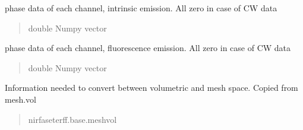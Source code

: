 \documentclass[letterpaper,10pt,english]{sphinxmanual}
\begin{document}
\begin{fulllineitems}
\begin{fulllineitems}
\begin{quote}
\begin{description}
\end{description}\end{quote}

\end{fulllineitems}


\begin{fulllineitems}
\label{\detokenize{_autosummary/nirfasterff.base.data.FLdata:nirfasterff.base.data.FLdata.phasemm}}
\pysigstartsignatures
{}
\pysigstopsignatures
\sphinxAtStartPar
phase data of each channel, intrinsic emission. All zero in case of CW data
\begin{quote}\begin{description}
\sphinxAtStartPar
double Numpy vector

\end{description}\end{quote}

\end{fulllineitems}


\begin{fulllineitems}
\label{\detokenize{_autosummary/nirfasterff.base.data.FLdata:nirfasterff.base.data.FLdata.phasefl}}
\pysigstartsignatures
{}
\pysigstopsignatures
\sphinxAtStartPar
phase data of each channel, fluorescence emission. All zero in case of CW data
\begin{quote}\begin{description}
\sphinxAtStartPar
double Numpy vector

\end{description}\end{quote}

\end{fulllineitems}


\begin{fulllineitems}
\label{\detokenize{_autosummary/nirfasterff.base.data.FLdata:nirfasterff.base.data.FLdata.vol}}
\pysigstartsignatures
{}
\pysigstopsignatures
\sphinxAtStartPar
Information needed to convert between volumetric and mesh space. Copied from mesh.vol
\begin{quote}\begin{description}
\sphinxAtStartPar
nirfaseterff.base.meshvol


\end{description}
\end{quote}
\end{fulllineitems}
\end{fulllineitems}
\end{document}
